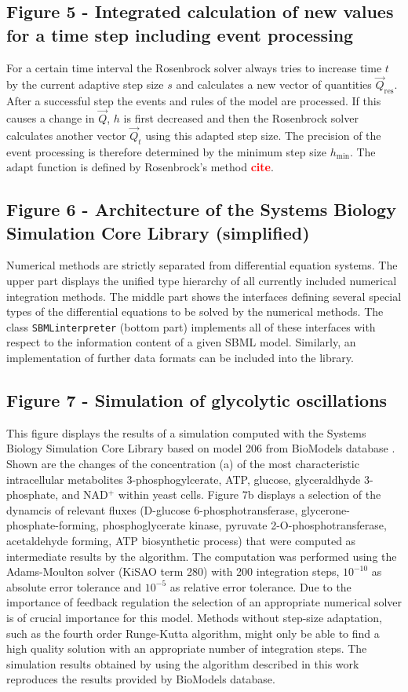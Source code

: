 \documentclass[10pt]{bmc_article}
\newenvironment{bmcformat}{\baselineskip20pt\sloppy\setboolean{publ}{false}}{\baselineskip20pt\sloppy}
\newcommand{\TODO}[1]{\textcolor{red}{\textbf{#1}}}
\newcommand{\SBMLinterpreter}{\texttt{SBML\-interpreter}}
\begin{document}
\begin{bmcformat}
\subsection*{Figure 5 - Integrated calculation of new values for a time step including event processing}
For a certain time interval the Rosenbrock solver always tries to increase time $t$ by the current adaptive
step size $s$ and calculates a new vector of quantities $\vec{Q}_{\mathrm{res}}$.
After a successful step the events and rules of the model are processed.
If this causes a change in $\vec{Q}$, $h$ is first decreased and then the Rosenbrock solver calculates another vector $\vec{Q}_{t}$ using this adapted step size.
The precision of the event processing is therefore determined by the minimum step size $h_{\min}$.
The $\mathrm{adapt}$ function is defined by Rosenbrock's method \TODO{cite}.

\subsection*{Figure 6 - Architecture of the Systems Biology Simulation Core Library (simplified)}
Numerical methods are strictly separated from differential equation systems. The
upper part displays the unified type hierarchy of all currently included numerical integration
methods. The middle part shows the interfaces defining several
special types of the differential equations to be solved by the numerical
methods.
The class \SBMLinterpreter{} (bottom part) implements all of these interfaces
with respect to the information content of a given SBML model. Similarly, an
implementation of further data formats can be included into the
library.

\subsection*{Figure 7 - Simulation of glycolytic oscillations}
This figure displays the results of a simulation computed with the Systems Biology Simulation Core Library based on model 206 from BioModels database \cite{Novere2006a, Wolf2000}.
Shown are the changes of the concentration (a) of the most characteristic intracellular metabolites 3-phosphogylcerate, ATP, glucose, glyceraldhyde 3-phosphate, and NAD$^+$ within yeast cells.
Figure 7b displays a selection of the dynamcis of relevant fluxes 
(\textsc{D}-glucose 6-phosphotransferase, glycerone-phosphate-forming, phosphoglycerate kinase, pyruvate 2-O-phosphotransferase, acetaldehyde forming, ATP biosynthetic process)
that were computed as intermediate results by the algorithm.
The computation was performed using the Adams-Moulton solver \cite{Hairer2000} (KiSAO term 280) with 200 integration steps, $10^{-10}$ as absolute error tolerance and $10^{-5}$ as relative error tolerance.
Due to the importance of feedback regulation the selection of an appropriate numerical solver is of crucial importance for this model.
Methods without step-size adaptation, such as the fourth order Runge-Kutta algorithm, might only be able to find a high quality solution with an appropriate number of integration steps. 
The simulation results obtained by using the algorithm described in this work reproduces the results provided by BioModels database. 


\end{bmcformat}
\end{document}
